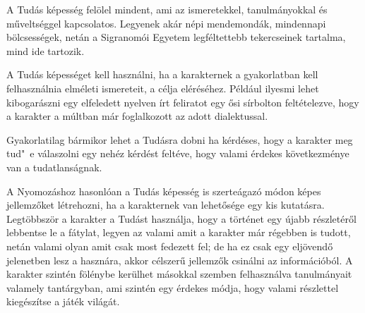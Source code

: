
A Tudás képesség felölel mindent, ami az ismeretekkel, tanulmányokkal és műveltséggel kapcsolatos. Legyenek akár népi mendemondák, mindennapi bölcsességek, netán a Sigranomói Egyetem legféltettebb tekercseinek tartalma, mind ide tartozik.

\overcome A Tudás képességet kell használni, ha a karakternek a gyakorlatban kell felhasználnia elméleti ismereteit, a célja eléréséhez. Például ilyesmi lehet kibogarászni egy elfeledett nyelven írt feliratot egy ősi sírbolton feltételezve, hogy a karakter a múltban már foglalkozott az adott dialektussal.

Gyakorlatilag bármikor lehet a Tudásra dobni ha kérdéses, hogy a karakter meg tud"~e válaszolni egy nehéz kérdést feltéve, hogy valami érdekes következménye van a tudatlanságnak.

\advantage A Nyomozáshoz hasonlóan a Tudás képesség is szerteágazó módon képes jellemzőket létrehozni, ha a karakternek van lehetősége egy kis kutatásra. Legtöbbször a karakter a Tudást használja, hogy a történet egy újabb részletéről lebbentse le a fátylat, legyen az valami amit a karakter már régebben is tudott, netán valami olyan amit csak most fedezett fel; de ha ez csak egy eljövendő jelenetben lesz a hasznára, akkor célszerű jellemzők csinálni az információból. A karakter szintén fölénybe kerülhet másokkal szemben felhasználva tanulmányait valamely tantárgyban, ami szintén egy érdekes módja, hogy valami részlettel kiegészítse a játék világát.

\noattackatall
 
\nodefendatall




